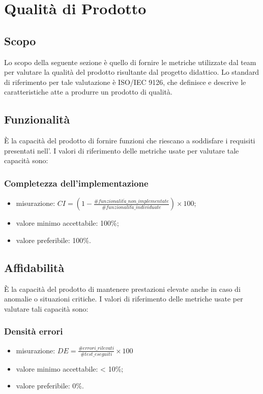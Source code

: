 \section{Qualità di Prodotto}
\subsection{Scopo}
Lo scopo della seguente sezione è quello di fornire le metriche utilizzate dal team \Gruppo{} per valutare la qualità del prodotto risultante dal progetto didattico. Lo standard di riferimento per tale valutazione è ISO/IEC 9126, che definisce e descrive le caratteristiche atte a produrre un prodotto di qualità.

\subsection{Funzionalità}
È la capacità del prodotto di fornire funzioni che riescano a soddisfare i requisiti presentati nell'\textit{\AdR}.
I valori di riferimento delle metriche usate per valutare tale capacità sono:

	\subsubsection*{Completezza dell'implementazione}
	\begin{itemize}
	\item{misurazione: $CI = (1- \displaystyle\frac{\#funzionalit\grave{a}\_non\_implementate}{\#funzionalit\grave{a}\_individuate})\times100$};
	\item {valore minimo accettabile: 100\%;}
	\item {valore preferibile: 100\%.}
	\end{itemize}
	
\subsection{Affidabilità}
È la capacità del prodotto di mantenere prestazioni elevate anche in caso di anomalie o situazioni critiche.
I valori di riferimento delle metriche usate per valutare tali capacità sono:

	\subsubsection*{Densità errori}
	\begin{itemize}
		\item{misurazione: $DE = \displaystyle\frac{\#errori\_rilevati}{\#test\_eseguiti}\times100$}
		\item {valore minimo accettabile: < 10\%;}
		\item {valore preferibile: 0\%.}
	\end{itemize}

